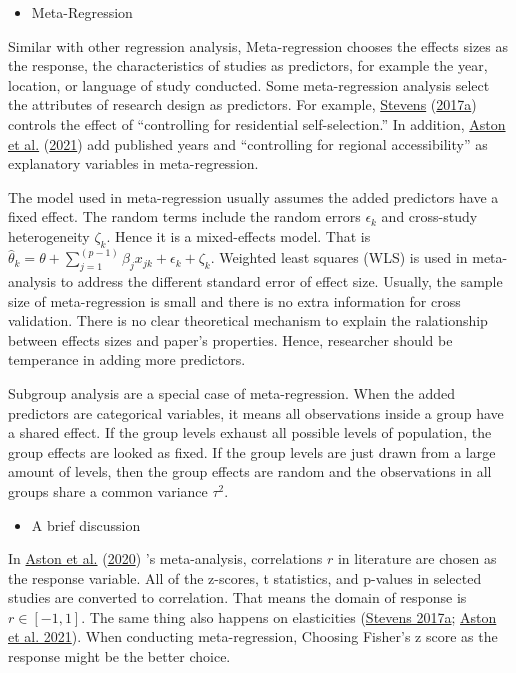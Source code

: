 \documentclass[
  11pt,
  openany]{memoir}
\providecommand{\tightlist}{%
  \setlength{\itemsep}{0pt}\setlength{\parskip}{0pt}}
\begin{document}
\begin{itemize}
\tightlist
\item
  Meta-Regression
\end{itemize}

Similar with other regression analysis, Meta-regression chooses the effects sizes as the response, the characteristics of studies as predictors, for example the year, location, or language of study conducted.
Some meta-regression analysis select the attributes of research design as predictors.
For example, \protect\hyperlink{ref-stevensDoesCompactDevelopment2017}{Stevens} (\protect\hyperlink{ref-stevensDoesCompactDevelopment2017}{2017a}) controls the effect of ``controlling for residential self-selection.''
In addition, \protect\hyperlink{ref-astonExploringBuiltEnvironment2021}{Aston et al.} (\protect\hyperlink{ref-astonExploringBuiltEnvironment2021}{2021}) add published years and ``controlling for regional accessibility'' as explanatory variables in meta-regression.

The model used in meta-regression usually assumes the added predictors have a fixed effect.
The random terms include the random errors \(\epsilon_k\) and cross-study heterogeneity \(\zeta_k\).
Hence it is a mixed-effects model.
That is \(\hat\theta_k = \theta + \sum_{j=1}^{(p-1)}\beta_j x_{jk} + \epsilon_k+\zeta_k\).
Weighted least squares (WLS) is used in meta-analysis to address the different standard error of effect size.
Usually, the sample size of meta-regression is small and there is no extra information for cross validation.
There is no clear theoretical mechanism to explain the ralationship between effects sizes and paper's properties.
Hence, researcher should be temperance in adding more predictors.

Subgroup analysis are a special case of meta-regression.
When the added predictors are categorical variables, it means all observations inside a group have a shared effect.
If the group levels exhaust all possible levels of population, the group effects are looked as fixed.
If the group levels are just drawn from a large amount of levels, then the group effects are random and the observations in all groups share a common variance \(\tau^2\).

\begin{itemize}
\tightlist
\item
  A brief discussion
\end{itemize}

In \protect\hyperlink{ref-astonStudyDesignImpacts2020}{Aston et al.} (\protect\hyperlink{ref-astonStudyDesignImpacts2020}{2020}) 's meta-analysis, correlations \(r\) in literature are chosen as the response variable.
All of the z-scores, t statistics, and p-values in selected studies are converted to correlation.
That means the domain of response is \(r\in[-1, 1]\).
The same thing also happens on elasticities (\protect\hyperlink{ref-stevensDoesCompactDevelopment2017}{Stevens 2017a}; \protect\hyperlink{ref-astonExploringBuiltEnvironment2021}{Aston et al. 2021}).
When conducting meta-regression, Choosing Fisher's z score as the response might be the better choice.
\end{document}
